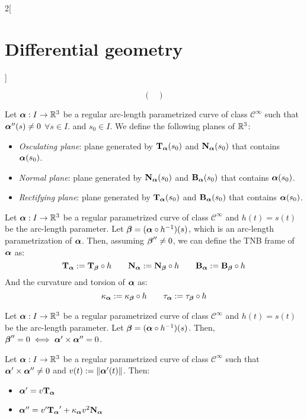 \documentclass[../../../main.tex]{subfiles}
\begin{document}
\begin{multicols}{2}[\section{Differential geometry}]
\begin{theorem}
$$\begin{pmatrix}
      \end{pmatrix}
    $$
  \end{theorem}
  \begin{definition}
    Let $\vf{\alpha}:I\rightarrow\RR^3$ be a regular arc-length parametrized curve of class $\mathcal{C}^\infty$ such that $\vf{\alpha}''(s)\ne 0$ $\forall s\in I$. and $s_0\in I$. We define the following planes of $\RR^3$:
    \begin{itemize}
      \item \emph{Osculating plane}: plane generated by $\T\alpha(s_0)$ and $\N\alpha(s_0)$ that contains $\vf{\alpha}(s_0)$.
      \item \emph{Normal plane}: plane generated by $\N\alpha(s_0)$ and $\B\alpha(s_0)$ that contains $\vf{\alpha}(s_0)$.
      \item \emph{Rectifying plane}: plane generated by $\T\alpha(s_0)$ and $\B\alpha(s_0)$ that contains $\vf{\alpha}(s_0)$.
    \end{itemize}
  \end{definition}
  \begin{proposition}
    Let $\vf{\alpha}:I\rightarrow\RR^3$ be a regular parametrized curve of class $\mathcal{C}^\infty$ and $h(t)=s(t)$ be the arc-length parameter. Let $\vf{\beta}=(\vf{\alpha}\circ h^{-1})(s)$, which is an arc-length parametrization of $\vf{\alpha}$. Then, assuming $\vf{\beta}''\ne 0$, we can define the TNB frame of $\vf{\alpha}$ as: $$\T\alpha:=\T\beta\circ h\qquad\N\alpha:=\N\beta\circ h\qquad\B\alpha:=\B\beta\circ h$$
    And the curvature and torsion of $\vf\alpha$ as: $$\ka\alpha:=\ka\beta\circ h\qquad\ta\alpha:=\ta\beta\circ h$$
  \end{proposition}
  \begin{lemma}
    Let $\vf{\alpha}:I\rightarrow\RR^3$ be a regular parametrized curve of class $\mathcal{C}^\infty$ and $h(t)=s(t)$ be the arc-length parameter. Let $\vf{\beta}=(\vf{\alpha}\circ h^{-1})(s)$. Then, $\vf{\beta}''=0\iff\vf\alpha'\times\vf\alpha''=0$.
  \end{lemma}
  \begin{proposition}
    Let $\vf{\alpha}:I\rightarrow\RR^3$ be a regular parametrized curve of class $\mathcal{C}^\infty$ such that $\vf{\alpha}'\times \vf{\alpha}''\ne 0$ and $v(t):=\|\vf{\alpha}'(t)\|$. Then:
    \begin{itemize}
      \item $\vf{\alpha}'=v\T\alpha$
      \item $\vf{\alpha}''=v'\T\alpha'+\ka\alpha v^2\N\alpha$
    \end{itemize}

\end{proposition}
\end{multicols}
\end{document}
